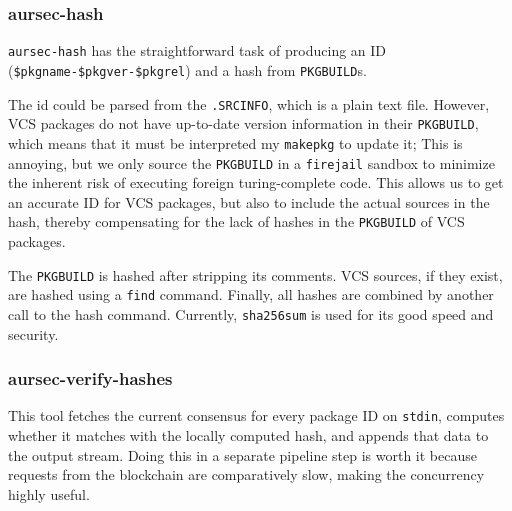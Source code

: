 \subsubsection{aursec-hash}
\texttt{aursec-hash} has the straightforward task of producing an ID (\texttt{\$pkgname-\$pkgver-\$pkgrel}) and a hash from \texttt{PKGBUILD}s.

The id could be parsed from the \texttt{.SRCINFO}, which is a plain text file.
However, VCS packages do not have up-to-date version information in their \texttt{PKGBUILD}, which means that it must be interpreted my \texttt{makepkg} to update it; This is annoying, but we only source the \texttt{PKGBUILD} in a \texttt{firejail} sandbox to minimize the inherent risk of executing foreign turing-complete code.
This allows us to get an accurate ID for VCS packages, but also to include the actual sources in the hash, thereby compensating for the lack of hashes in the \texttt{PKGBUILD} of VCS packages.

The \texttt{PKGBUILD} is hashed after stripping its comments. VCS sources, if they exist, are hashed using a \texttt{find} command.
Finally, all hashes are combined by another call to the hash command.
Currently, \texttt{sha256sum} is used for its good speed and security.

\subsubsection{aursec-verify-hashes}
This tool fetches the current consensus for every package ID on \texttt{stdin}, computes whether it matches with the locally computed hash, and appends that data to the output stream.
Doing this in a separate pipeline step is worth it because requests from the blockchain are comparatively slow, making the concurrency highly useful.
